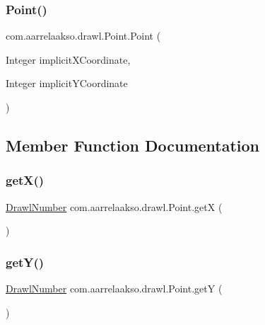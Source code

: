 \subsubsection{\texorpdfstring{Point()}{Point()}\hspace{0.1cm}{\footnotesize\ttfamily [2/2]}}
{\footnotesize\ttfamily com.\+aarrelaakso.\+drawl.\+Point.\+Point (\begin{DoxyParamCaption}\item[{Integer}]{implicit\+X\+Coordinate,  }\item[{Integer}]{implicit\+Y\+Coordinate }\end{DoxyParamCaption})\hspace{0.3cm}{\ttfamily [protected]}}



\subsection{Member Function Documentation}
\mbox{\label{classcom_1_1aarrelaakso_1_1drawl_1_1_point_a69062d6a80ab951e2687e31d2b3f99ee}} 
\subsubsection{\texorpdfstring{get\+X()}{getX()}}
{\footnotesize\ttfamily \hyperlink{classcom_1_1aarrelaakso_1_1drawl_1_1_drawl_number}{Drawl\+Number} com.\+aarrelaakso.\+drawl.\+Point.\+getX (\begin{DoxyParamCaption}{ }\end{DoxyParamCaption})\hspace{0.3cm}{\ttfamily [protected]}}

\mbox{\label{classcom_1_1aarrelaakso_1_1drawl_1_1_point_a9b4a6a3de7c80227d5d318dc9afb4edd}} 
\subsubsection{\texorpdfstring{get\+Y()}{getY()}}
{\footnotesize\ttfamily \hyperlink{classcom_1_1aarrelaakso_1_1drawl_1_1_drawl_number}{Drawl\+Number} com.\+aarrelaakso.\+drawl.\+Point.\+getY (\begin{DoxyParamCaption}{ }\end{DoxyParamCaption})\hspace{0.3cm}{\ttfamily [protected]}}




